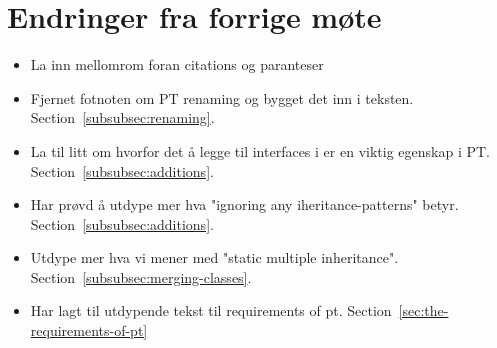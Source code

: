 
\chapter*{Endringer fra forrige møte}

\begin{itemize}
    \item La inn mellomrom foran citations og paranteser
    \item Fjernet fotnoten om PT renaming og bygget det inn i teksten.
    Section~\vref{subsubsec:renaming}.
    \item La til litt om hvorfor det å legge til interfaces i  er en viktig egenskap i PT.
    Section~\vref{subsubsec:additions}.
    \item Har prøvd å utdype mer hva "ignoring any iheritance-patterns" betyr.
    Section~\vref{subsubsec:additions}.
    \item Utdype mer hva vi mener med "static multiple inheritance".
    Section~\vref{subsubsec:merging-classes}.
    \item Har lagt til utdypende tekst til requirements of pt.
    Section~\vref{sec:the-requirements-of-pt}
\end{itemize}

